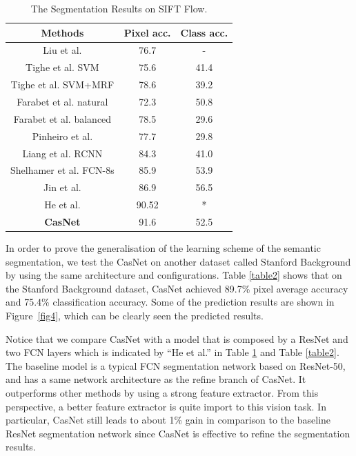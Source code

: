 \documentclass[10.5pt,compsoc]{TsT}
\newcommand{\upcite}[1]{\superscript{\textsuperscript{\cite{#1}}}}
\theoremstyle{mystyle}
\newcommand{\upcite}[1]{\textsuperscript{\cite{#1}}}
\begin{document}
\begin{table}[h]
\large
\setlength{\belowcaptionskip}{12pt}
\caption{The Segmentation Results on SIFT Flow.}
\label{table1}
\centering
\begin{tabular}{ccc}
\hline 
Methods & Pixel acc. & Class acc. \\
\hline
Liu et al.\upcite{6} & 76.7 & - \\
Tighe et al. SVM\upcite{25} & 75.6 & 41.4 \\
Tighe et al. SVM+MRF\upcite{26} & 78.6 & 39.2 \\
Farabet et al. natural\upcite{11} & 72.3 & 50.8 \\
Farabet et al. balanced\upcite{11} & 78.5 & 29.6 \\
Pinheiro et al.\upcite{13} & 77.7 & 29.8 \\
Liang et al. RCNN\upcite{24} & 84.3 & 41.0 \\
Shelhamer et al. FCN-8s\upcite{4} & 85.9 & 53.9 \\
Jin et al. \upcite{37} & 86.9 & 56.5 \\
He et al. \upcite{1} & 90.52  & * \\
\textbf{CasNet} & 91.6 & 52.5 \\

\hline
\end{tabular}
\end{table}

In order to prove the generalisation of the learning scheme of the semantic segmentation, we test the CasNet on another dataset called Stanford Background by using the same architecture and configurations. Table \ref{table2} shows that on the Stanford Background dataset, CasNet achieved 89.7\% pixel average accuracy and 75.4\% classification accuracy. Some of the prediction results are shown in Figure~\ref{fig4}, which can be clearly seen the predicted results.



Notice that we compare CasNet with a model that is composed by a ResNet and two FCN layers which is indicated by ``He et al.\upcite{1}'' in Table \ref{table1} and Table \ref{table2}. The baseline model is a  typical FCN segmentation network based on ResNet-50, and has a same network architecture as the refine branch of CasNet. It outperforms other methods by using a strong feature extractor. From this perspective, a better feature extractor is quite import to this vision task. In particular, CasNet still leads to about 1\% gain in comparison to the baseline ResNet segmentation network since CasNet is effective to refine the segmentation results.
\end{document}
